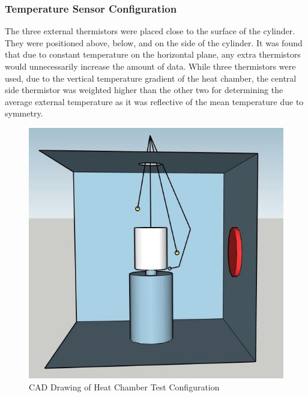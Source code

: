 \subsubsection{Temperature Sensor Configuration}
The three external thermistors were placed close to the surface of the cylinder. They were positioned above, below, and on the side of the cylinder. It was found that due to constant temperature on the horizontal plane, any extra thermistors would unnecessarily increase the amount of data. While three thermistors were used, due to the vertical temperature gradient of the heat chamber, the central side thermistor was weighted higher than the other two for determining the average external temperature as it was reflective of the mean temperature due to symmetry.
\newpage
\begin{figure}[!htb]
    \centering
    \includegraphics[width=0.4\linewidth, frame]{other/heat_chamber_cad.jpg}
    \caption{CAD Drawing of Heat Chamber Test Configuration}
    \label{fig:heat_chamber_cad}
\end{figure}
